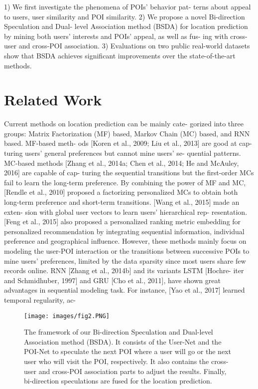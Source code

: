 \documentclass{article}
\begin{document}
1) We first investigate the phenomena of POIs’ behavior pat-
terns about appeal to users, user similarity and POI similarity.
2) We propose a novel Bi-direction Speculation and Dual-
level Association method (BSDA) for location prediction by
mining both users’ interests and POIs’ appeal, as well as fus-
ing with cross-user and cross-POI association. 3) Evaluations
on two public real-world datasets show that BSDA achieves
significant improvements over the state-of-the-art methods.

\section{Related Work}
Current methods on location prediction can be mainly cate-
gorized into three groups: Matrix Factorization (MF) based,
Markov Chain (MC) based, and RNN based. MF-based meth-
ods [Koren et al., 2009; Liu et al., 2013] are good at cap-
turing users’ general preferences but cannot mine users’ se-
quential patterns. MC-based methods [Zhang et al., 2014a;
Chen et al., 2014; He and McAuley, 2016] are capable of cap-
turing the sequential transitions but the first-order MCs fail
to learn the long-term preference. By combining the power
of MF and MC, [Rendle et al., 2010] proposed a factorizing
personalized MCs to obtain both long-term preference and
short-term transitions. [Wang et al., 2015] made an exten-
sion with global user vectors to learn users’ hierarchical rep-
resentation. [Feng et al., 2015] also proposed a personalized
ranking metric embedding for personalized recommendation
by integrating sequential information, individual preference
and geographical influence. However, these methods mainly
focus on modeling the user-POI interaction or the transitions
between successive POIs to mine users’ preferences, limited
by the data sparsity since most users share few records online.
RNN [Zhang et al., 2014b] and its variants LSTM [Hochre-
iter and Schmidhuber, 1997] and GRU [Cho et al., 2011],
have shown great advantages in sequential modeling task. For
instance, [Yao et al., 2017] learned temporal regularity, ac-

\begin{figure*}
    \centering
    \texttt{[image: images/fig2.PNG]}
    \caption{The framework of our Bi-direction Speculation and Dual-level Association method (BSDA). It consists of the User-Net and the POI-Net to speculate the next POI where a user will go or the next user who will visit the POI, respectively. It also contains the cross-user and cross-POI association parts to adjust the results. Finally, bi-direction speculations are fused for the location prediction.}
    \label{fig:fig2}
\end{figure*}
\end{document}
